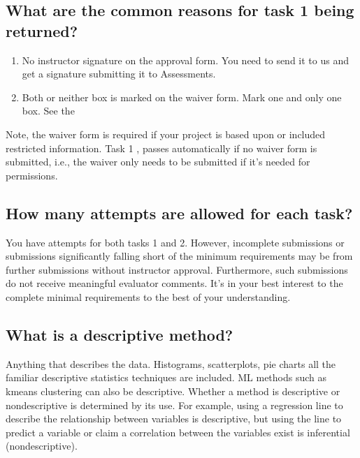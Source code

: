 \documentclass[letterpaper,10pt,english]{jupyterBook}
\begin{document}
\subsection{What are the common reasons for task 1 being returned?}
\label{\detokenize{task1:what-are-the-common-reasons-for-task-1-being-returned}}\begin{enumerate}
%
\item {} 
\sphinxAtStartPar
No instructor signature on the approval form. You need to send it to us and get a signature  submitting it to Assessments.

\item {} 
\sphinxAtStartPar
Both or neither box is marked on the waiver form. Mark one and only one box. See the {\hyperref[\detokenize{task1:task1-waiver-form}]{}}

\end{enumerate}

\sphinxAtStartPar
Note, the waiver form is  required if your project is based upon or included restricted information. Task 1 , passes automatically if no waiver form is submitted, i.e., the waiver only needs to be submitted if it’s needed for permissions.


\subsection{How many attempts are allowed for each task?}
\label{\detokenize{task1:how-many-attempts-are-allowed-for-each-task}}
\sphinxAtStartPar
You have  attempts for both tasks 1 and 2. However, incomplete submissions or submissions significantly falling short of the minimum requirements may be  from further submissions without instructor approval. Furthermore, such submissions do not receive meaningful evaluator comments. It’s in your best interest to the complete minimal requirements to the best of your understanding.


\subsection{What is a descriptive method?}
\label{\detokenize{task1:what-is-a-descriptive-method}}
\sphinxAtStartPar
Anything that describes the data. Histograms, scatterplots, pie charts \sphinxhyphen{}all the familiar descriptive statistics techniques are included. ML methods such as k\sphinxhyphen{}means clustering can also be descriptive. Whether a method is descriptive or non\sphinxhyphen{}descriptive is determined by its use. For example, using a regression line to describe the relationship between variables is descriptive, but using the line to predict a variable or claim a correlation between the variables exist is inferential (non\sphinxhyphen{}descriptive).
\end{document}
